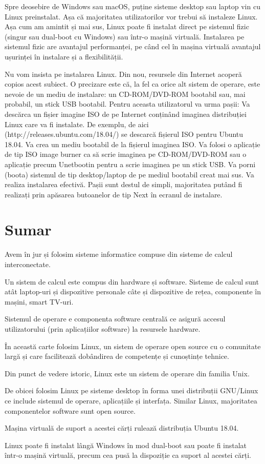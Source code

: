 Spre deosebire de Windows sau macOS, puține sisteme desktop sau laptop vin cu Linux preinstalat. Așa că majoritatea utilizatorilor vor trebui să instaleze Linux. Așa cum am amintit și mai sus, Linux poate fi instalat direct pe sistemul fizic (singur sau dual-boot cu Windows) sau într-o mașină virtuală. Instalarea pe sistemul fizic are avantajul performanței, pe când cel în mașina virtuală avantajul ușurinței în instalare și a flexibilității.

Nu vom insista pe instalarea Linux. Din nou, resursele din Internet acoperă copios acest subiect. O precizare este că, la fel ca orice alt sistem de operare, este nevoie de un mediu de instalare: un CD-ROM/DVD-ROM bootabil sau, mai probabil, un stick USB bootabil. Pentru aceasta utilizatorul va urma pașii:
Va descărca un fișier imagine ISO de pe Internet conținând imaginea distribuției Linux care va fi instalate. De exemplu, de aici (http://releases.ubuntu.com/18.04/) se descarcă fișierul ISO pentru Ubuntu 18.04.
Va crea un mediu bootabil de la fișierul imaginea ISO. Va folosi o aplicație de tip ISO image burner ca să scrie imaginea pe CD-ROM/DVD-ROM sau o aplicație precum Unetbootin pentru a scrie imaginea pe un stick USB.
Va porni (boota) sistemul de tip desktop/laptop de pe mediul bootabil creat mai sus.
Va realiza instalarea efectivă. Pașii sunt destul de simpli, majoritatea putând fi realizați prin apăsarea butoanelor de tip Next în ecranul de instalare.

\section{Sumar}
\label{sec:intro:summary}

Avem în jur și folosim sisteme informatice compuse din sisteme de calcul interconectate.

Un sistem de calcul este compus din hardware și software. Sisteme de calcul sunt atât laptop-uri și dispozitive personale câte și dispozitive de rețea, componente în mașini, smart TV-uri.

Sistemul de operare e componenta software centrală ce asigură accesul utilizatorului (prin aplicațiilor software) la resursele hardware.

În această carte folosim Linux, un sistem de operare open source cu o comunitate largă și care facilitează dobândirea de competențe și cunoștințe tehnice.

Din punct de vedere istoric, Linux este un sistem de operare din familia Unix.

De obicei folosim Linux pe sisteme desktop în forma unei distribuții GNU/Linux ce include sistemul de operare, aplicațiile și interfața. Similar Linux, majoritatea componentelor software sunt open source.

Mașina virtuală de suport a acestei cărți rulează distribuția Ubuntu 18.04.

Linux poate fi instalat lângă Windows în mod dual-boot sau poate fi instalat într-o mașină virtuală, precum cea pusă la dispoziție ca suport al acestei cărți.
